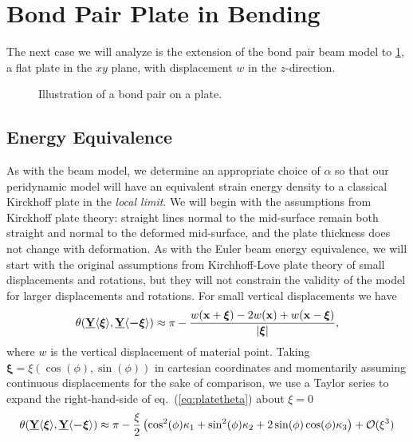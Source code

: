 \section{Bond Pair Plate in Bending}
The next case we will analyze is the extension of the bond pair beam model to \cref{fig:BondPairPlate}, a flat plate in the \(xy\) plane, with displacement $w$ in the \(z\)-direction. 
%
\begin{figure}[htbp]
    \centering
    \caption{Illustration of a bond pair on a plate.}
    \label{fig:BondPairPlate}
\end{figure}
%

\subsection{Energy Equivalence}
%
As with the beam model, we determine an appropriate choice of $\alpha$ so that our peridynamic model will have an equivalent strain energy density to a classical Kirckhoff plate in the \emph{local limit}.  We will begin with the assumptions from Kirckhoff plate theory: straight lines normal to the mid-surface remain both straight and normal to the deformed mid-surface, and the plate thickness does not change with deformation.  As with the Euler beam energy equivalence, we will start with the original assumptions from Kirchhoff-Love plate theory of small displacements and rotations, but they will not constrain the validity of the model for larger displacements and rotations.  For small vertical displacements we have
%
\begin{equation}
    \theta(\vstate{Y}{}{\boldsymbol{\xi}},\vstate{Y}{}{\boldsymbol{-\xi}}) \approx \pi-\frac{w(\mathbf{x}+\boldsymbol{\xi})-2w(\mathbf{x})+w(\mathbf{x}-\boldsymbol{\xi})}{|\boldsymbol{\xi}|},
    \label{eq:platetheta}
\end{equation}
%
where $w$ is the vertical displacement of material point.  Taking \(\boldsymbol{\xi}=\xi (\cos(\phi),\sin(\phi))\) in cartesian coordinates and momentarily assuming continuous displacements for the sake of comparison, we use a Taylor series to expand the right-hand-side of eq.~(\ref{eq:platetheta}) about \(\xi = 0\) 
%
\begin{equation}
    \theta(\vstate{Y}{}{\boldsymbol{\xi}},\vstate{Y}{}{\boldsymbol{-\xi}}) \approx \pi-\frac{\xi}{2} \left(\cos^2(\phi) \kappa_1+\sin^2(\phi) \kappa_2+2\sin(\phi)\cos(\phi)\kappa_3\right)+\mathcal{O}(\xi^3)
    \label{eq:platetheta2}
\end{equation}
